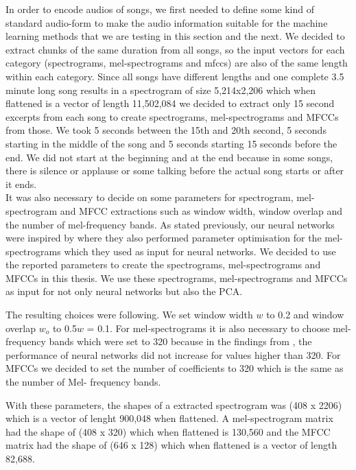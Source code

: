 In order to encode audios of songs, we first needed to define some kind of standard audio-form to make the audio information suitable for the machine learning methods that we are testing in this section and the next. We decided to extract chunks of the same duration from all songs, so the input vectors for each category (spectrograms, mel-spectrograms and mfccs) are also of the same length within each category. Since all songs have different lengths and one complete 3.5 minute long song results in a spectrogram of size 5,214x2,206 which when flattened is a vector of length 11,502,084 we decided to extract only 15 second excerpts from each song to create spectrograms, mel-spectrograms and MFCCs from those. We took 5 seconds between the 15th and 20th second, 5 seconds starting in the middle of the song and 5 seconds starting 15 seconds before the end. We did not start at the beginning and at the end because in some songs, there is silence or applause or some talking before the actual song starts or after it ends. \\

It was also necessary to decide on some parameters for spectrogram, mel-spectrogram and MFCC extractions such as window width, window overlap and the number of mel-frequency bands. As stated previously, our neural networks were inspired by \cite{inproceedings_RNNs} where they also performed parameter optimisation for the mel-spectrograms which they used as input for neural networks. We decided to use the reported parameters to create the spectrograms, mel-spectrograms and MFCCs in this thesis. We use these spectrograms, mel-spectrograms and MFCCs as input for not only neural networks but also the PCA.

The resulting choices were following. We set window width $w$ to 0.2 and window overlap $w_o$ to 0.5$w$ = 0.1. For mel-spectrograms it is also necessary to choose mel-frequency bands which were set to 320 because in the findings from \cite{inproceedings_RNNs}, the performance of neural networks did not increase for values higher than 320. For MFCCs we decided to set the number of coefficients to 320 which is the same as the number of Mel- frequency bands.

With these parameters, the shapes of a extracted spectrogram was (408 x 2206) which is a vector of lenght 900,048 when flattened. A mel-spectrogram matrix had the shape of (408 x 320) which when flattened is 130,560 and the MFCC matrix had the shape of (646 x 128) which when flattened is a vector of length 82,688.

